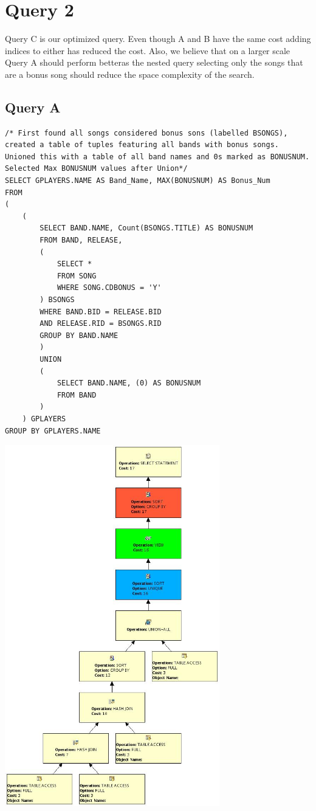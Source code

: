 \documentclass{report}
\begin{document}
\section*{Query 2}
Query C is our optimized query. Even though A and B have the same
cost adding indices to either has reduced the cost. Also, we believe
that on a larger scale Query A should perform betteras the nested
query selecting only the songs that are a bonus song should reduce the
space complexity of the search. 
\subsection*{Query A}
\begin{verbatim}
/* First found all songs considered bonus sons (labelled BSONGS),
created a table of tuples featuring all bands with bonus songs.
Unioned this with a table of all band names and 0s marked as BONUSNUM.
Selected Max BONUSNUM values after Union*/
SELECT GPLAYERS.NAME AS Band_Name, MAX(BONUSNUM) AS Bonus_Num
FROM
(
    (
        SELECT BAND.NAME, Count(BSONGS.TITLE) AS BONUSNUM
        FROM BAND, RELEASE, 
        (
            SELECT *
            FROM SONG
            WHERE SONG.CDBONUS = 'Y'
        ) BSONGS
        WHERE BAND.BID = RELEASE.BID
        AND RELEASE.RID = BSONGS.RID
        GROUP BY BAND.NAME
        ) 
        UNION 
        ( 
            SELECT BAND.NAME, (0) AS BONUSNUM
            FROM BAND
        )
    ) GPLAYERS
GROUP BY GPLAYERS.NAME
\end{verbatim}
\includegraphics[width=0.7\textwidth]{Q2A}
\end{document}
